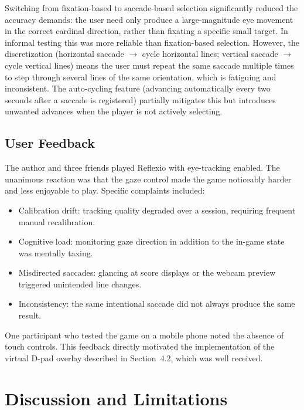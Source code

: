 \documentclass[11pt,twocolumn]{article}
\begin{document}
Switching from fixation-based to saccade-based selection significantly reduced
the accuracy demands: the user need only produce a large-magnitude eye movement
in the correct cardinal direction, rather than fixating a specific small target.
In informal testing this was more reliable than fixation-based selection.
However, the discretization (horizontal saccade $\to$ cycle horizontal lines;
vertical saccade $\to$ cycle vertical lines) means the user must repeat the
same saccade multiple times to step through several lines of the same
orientation, which is fatiguing and inconsistent. The auto-cycling feature
(advancing automatically every two seconds after a saccade is registered)
partially mitigates this but introduces unwanted advances when the player is not
actively selecting.

\subsection{User Feedback}

The author and three friends played Reflexio with eye-tracking enabled. The
unanimous reaction was that the gaze control made the game noticeably harder and
less enjoyable to play. Specific complaints included:

\begin{itemize}[noitemsep]
  \item Calibration drift: tracking quality degraded over a session,
        requiring frequent manual recalibration.
  \item Cognitive load: monitoring gaze direction in addition to the in-game
        state was mentally taxing.
  \item Misdirected saccades: glancing at score displays or the webcam
        preview triggered unintended line changes.
  \item Inconsistency: the same intentional saccade did not always produce the
        same result.
\end{itemize}

One participant who tested the game on a mobile phone noted the absence of touch
controls. This feedback directly motivated the implementation of the virtual
D-pad overlay described in Section~4.2, which was well received.

\section{Discussion and Limitations}
\end{document}
